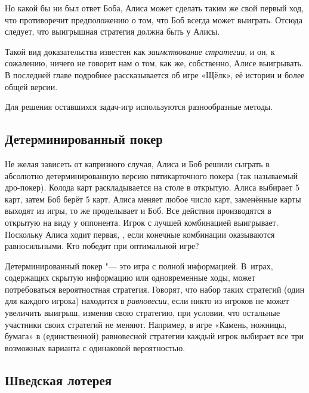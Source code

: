 \documentclass[twoside]{book}
\makeatletter
\newcommand{\rindex}[2][\imki@jobname]{%
  \index[#1]{\detokenize{#2}}%
}
\makeatother
\begin{document}
Но какой бы ни был ответ Боба, Алиса может сделать таким же свой первый ход, что противоречит предположению о том, что Боб всегда может выиграть.
Отсюда следует,
что выигрышная стратегия должна быть у Алисы.
\heart

Такой вид доказательства известен как \emph{заимствование стратегии}, и он, к сожалению, ничего не говорит нам о том, как же, собственно, Алисе выигрывать.
В последней главе подробнее рассказывается об игре «Щёлк», её истории и более общей версии.

\medskip

Для решения оставшихся задач-игр используются разнообразные методы.

\subsection*{Детерминированный покер}%
\rindex{Детерминированный покер}

Не желая зависеть от капризного случая, Алиса и Боб решили сыграть в абсолютно детерминированную версию пятикарточного покера (так называемый дро-покер).
Колода карт раскладывается на столе в открытую.
Алиса выбирает 5 карт, затем Боб берёт 5 карт.
Алиса меняет любое число карт, заменённые карты выходят из игры, то же проделывает и Боб.
Все действия производятся в открытую на виду у оппонента.
Игрок с лучшей комбинацией выигрывает.
Поскольку Алиса ходит первая, , если конечные комбинации оказываются равносильными.
Кто победит при оптимальной игре?

\medskip


Детерминированный покер "--- это игра с полной информацией.
В~играх, содержащих скрытую информацию или одновременные ходы, может потребоваться вероятностная стратегия.
Говорят, что набор таких стратегий (один для каждого игрока) находится в \emph{равновесии}, если никто из игроков не может увеличить выигрыш, изменив свою стратегию, при условии, что остальные участники своих стратегий не меняют.
Например, в игре «Камень, ножницы, бумага» в (единственной) равновесной стратегии каждый игрок выбирает все три возможных варианта с одинаковой вероятностью.

\subsection*{Шведская лотерея}%
\rindex{Шведская лотерея}
\end{document}
